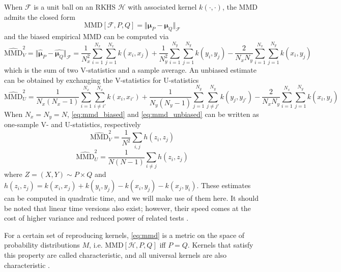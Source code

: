 \documentclass[a4paper,11pt]{article}
\begin{document}
When $\mathcal{F}$ is a unit ball on an RKHS $\mathcal{H}$ with associated kernel $k(\cdot, \cdot)$, the MMD admits the closed form
\begin{equation}
        \mathrm{MMD}[\mathcal{F}, P, Q] = \Vert \mathbf{\mu}_{P}-\mathbf{\mu}_{Q} \Vert_{\mathcal{F}}
    \label{eq:mmd_closed}
\end{equation}
and the biased empirical MMD can be computed via
\begin{equation}
        \widehat{\mathrm{MMD}}_{V}^{2} = \Vert \hat{\mathbf{\mu}}_{P}-\hat{\mathbf{\mu}_{Q}} \Vert_{\mathcal{F}} = \frac{1}{N_{x}^{2}} \sum_{i=1}^{N_{x}} \sum_{j=1}^{N_{x}} k\left(x_{i}, x_{j}\right)+\frac{1}{N_{y}^{2}} \sum_{i=1}^{N_{y}} \sum_{j=1}^{N_{y}} k\left(y_{i}, y_{j}\right)
        -\frac{2}{N_{x} N_{y}} \sum_{i=1}^{N_{x}} \sum_{j=1}^{N_{y}} k\left(x_{i}, y_{j}\right)
        \label{eq:mmd_biased}
\end{equation}
which is the sum of two V-statistics and a sample average. An unbiased estimate can be obtained by exchanging the V-statistics for U-statistics
\begin{equation}
    \widehat{\mathrm{MMD}}_{U}^{2} = \frac{1}{N_{x}(N_{x}-1)} \sum_{i = 1}^{N_{x}} \sum_{i \neq i'}^{N_{x}} k\left(x_{i}, x_{i'}\right)+\frac{1}{N_{y}(N_{y}-1)} \sum_{j = 1}^{N_{y}} \sum_{j \neq j'}^{N_{y}} k\left(y_{j}, y_{j'}\right)-\frac{2}{N_{x}N_{y}} \sum_{i = 1}^{N_{x}} \sum_{j = 1}^{N_{y}} k\left(x_{i}, y_{j}\right)
    \label{eq:mmd_unbiased}
\end{equation}
When $N_{x}=N_{y}=N$, \eqref{eq:mmd_biased} and \eqref{eq:mmd_unbiased} can be written as one-sample V- and U-statistics, respectively
\begin{equation}
    \widehat{\mathrm{MMD}}_{V}^{2} = \frac{1}{N^{2}} \sum_{i, j} h(z_{i}, z_{j})
    \label{eq:mmd_biased_v}
\end{equation}
\begin{equation}
    \widehat{\mathrm{MMD}}_{U}^{2} = \frac{1}{N(N-1)} \sum_{i \neq j} h(z_{i}, z_{j})
    \label{eq:mmd_unbiased_u}
\end{equation}
where $Z = (X, Y) \sim P \times Q$ and $h(z_{i}, z_{j})=k(x_{i}, x_{j}) + k(y_{i}, y_{j}) - k(x_{i}, y_{j}) - k(x_{j}, y_{i})$. These estimates can be computed in quadratic time, and we will make use of them here. It should be noted that linear time versions also exist; however, their speed comes at the cost of higher variance and reduced power of related tests \cite{gretton_kernel_2012}.

For a certain set of reproducing kernels, \eqref{eq:mmd} is a metric on the space of probability distributions $M$, i.e. $\mathrm{MMD}[\mathcal{H}, P, Q]$ iff $P=Q$. Kernels that satisfy this property are called characteristic, and all universal kernels are also characteristic \cite{sriperumbudur_hilbert_2010}.
\end{document}
